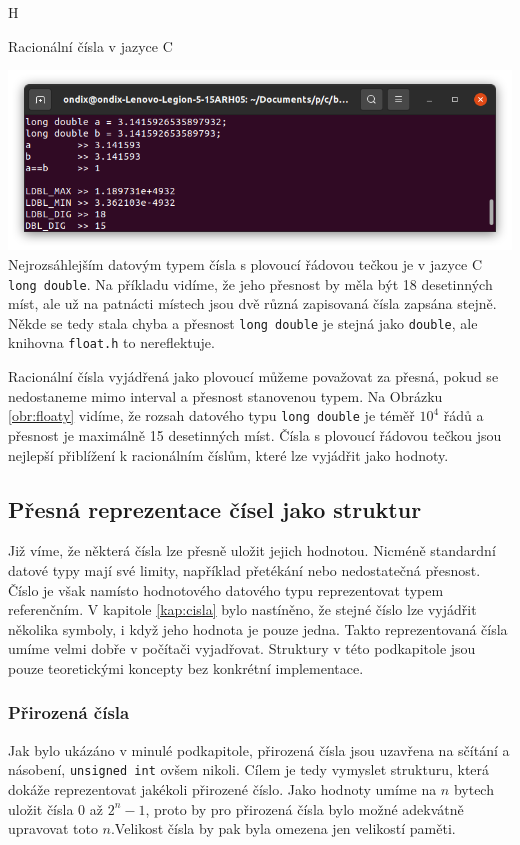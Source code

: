 \begin{myfigure}{H}
\caption{Racionální čísla v jazyce C}
\includegraphics[width=\linewidth]{./graphics/floaty.png}\label{obr:floaty}
Nejrozsáhlejším datovým typem čísla s plovoucí řádovou tečkou je v jazyce C \texttt{long double}. Na příkladu vidíme, že jeho přesnost by měla být 18 desetinných míst, ale už na patnácti místech jsou dvě různá zapisovaná čísla zapsána stejně. Někde se tedy stala chyba a přesnost \texttt{long double} je stejná jako \texttt{double}, ale knihovna \texttt{float.h} to nereflektuje.
\end{myfigure}

Racionální čísla vyjádřená jako plovoucí můžeme považovat za přesná, pokud se nedostaneme mimo interval a přesnost stanovenou typem. Na Obrázku \ref{obr:floaty} vidíme, že rozsah datového typu \texttt{long double} je téměř $10^4$ řádů a přesnost je maximálně 15 desetinných míst. Čísla s plovoucí řádovou tečkou jsou nejlepší přiblížení k racionálním číslům, které lze vyjádřit jako hodnoty.

\subsection{Přesná reprezentace čísel jako struktur}
Již víme, že některá čísla lze přesně uložit jejich hodnotou. Nicméně standardní datové typy mají své limity, například přetékání nebo nedostatečná přesnost. Číslo je však namísto hodnotového datového typu reprezentovat typem referenčním. V kapitole \ref{kap:cisla} bylo nastíněno, že stejné číslo lze vyjádřit několika symboly, i když jeho hodnota je pouze jedna. Takto reprezentovaná čísla umíme velmi dobře v počítači vyjadřovat. Struktury v této podkapitole jsou pouze teoretickými koncepty bez konkrétní implementace.

\subsubsection{Přirozená čísla}
Jak bylo ukázáno v minulé podkapitole, přirozená čísla jsou uzavřena na sčítání a násobení, \texttt{unsigned int} ovšem nikoli. Cílem je tedy vymyslet strukturu, která dokáže reprezentovat jakékoli přirozené číslo. Jako hodnoty umíme na $n$ bytech uložit čísla $0$ až $2^n-1$, proto by pro přirozená čísla bylo možné adekvátně upravovat toto $n$.Velikost čísla by pak byla omezena jen velikostí paměti.

